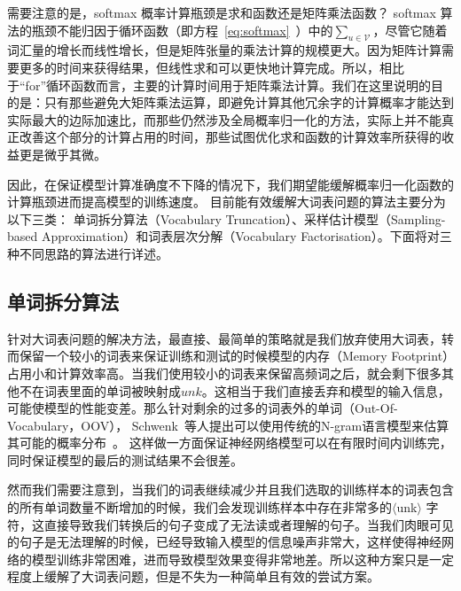 需要注意的是，softmax 概率计算瓶颈是求和函数还是矩阵乘法函数？ softmax 算法的瓶颈不能归因于循环函数（即方程~\ref{eq:softmax}~）中的$ \sum_ {u \in \mathcal {V}} $，尽管它随着词汇量的增长而线性增长，但是矩阵张量的乘法计算的规模更大。因为矩阵计算需要更多的时间来获得结果，但线性求和可以更快地计算完成。所以，相比于``for''循环函数而言，主要的计算时间用于矩阵乘法计算。我们在这里说明的目的是：只有那些避免大矩阵乘法运算，即避免计算其他冗余字的计算概率才能达到实际最大的边际加速比，而那些仍然涉及全局概率归一化的方法，实际上并不能真正改善这个部分的计算占用的时间，那些试图优化求和函数的计算效率所获得的收益更是微乎其微。



因此，在保证模型计算准确度不下降的情况下，我们期望能缓解概率归一化函数的计算瓶颈进而提高模型的训练速度。 目前能有效缓解大词表问题的算法主要分为以下三类： 单词拆分算法（Vocabulary Truncation）、采样估计模型（Sampling-based Approximation）和词表层次分解（Vocabulary Factorisation）。下面将对三种不同思路的算法进行详述。


\subsection{单词拆分算法}
针对大词表问题的解决方法，最直接、最简单的策略就是我们放弃使用大词表，转而保留一个较小的词表来保证训练和测试的时候模型的内存（Memory Footprint）占用小和计算效率高。当我们使用较小的词表来保留高频词之后，就会剩下很多其他不在词表里面的单词被映射成$unk$。这相当于我们直接丢弃和模型的输入信息，可能使模型的性能变差。那么针对剩余的过多的词表外的单词（Out-Of-Vocabulary，OOV）， Schwenk~等人提出可以使用传统的N-gram语言模型来估算其可能的概率分布~。
这样做一方面保证神经网络模型可以在有限时间内训练完，同时保证模型的最后的测试结果不会很差。

然而我们需要注意到，当我们的词表继续减少并且我们选取的训练样本的词表包含的所有单词数量不断增加的时候，我们会发现训练样本中存在非常多的$\langle$unk$\rangle$ 字符，这直接导致我们转换后的句子变成了无法读或者理解的句子。当我们肉眼可见的句子是无法理解的时候，已经导致输入模型的信息噪声非常大，这样使得神经网络的模型训练非常困难，进而导致模型效果变得非常地差。所以这种方案只是一定程度上缓解了大词表问题，但是不失为一种简单且有效的尝试方案。

